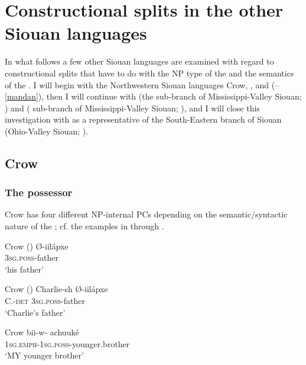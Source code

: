 \documentclass[output=paper]{LSP/langsci}
\begin{document}
\section{Constructional splits in the other Siouan languages}

In what follows a few other Siouan languages are examined with regard to constructional splits that have to do with the NP type of the  and the semantics of the . I will begin with the Northwestern Siouan languages Crow, , and  (--\ref{mandan}), then I will continue with  (the  sub-branch of Mississippi-Valley Siouan; ) and  ( sub-branch of Mississippi-Valley Siouan; ), and I will close this investigation with  as a representative of the South-Eastern branch of Siouan (Ohio-Valley Siouan; ).
 
\subsection{Crow}\label{sec:helmbrecht:4.1} \label{crow} 
\subsubsection{The possessor}
Crow has four different NP-internal PCs depending on the semantic/syntactic nature of the ; cf. the examples in  through . 

\ea {}Crow (\citealt[234]{Graczyk2007}) \label{crowfather}
\ex
\gll Ø-iilápxe \\
\textsc{3sg.poss}-father \\
\glt `his father'
\z
\z

\ea {}Crow (\citealt[234]{Graczyk2007}) \label{crowcharlie}
\ex
\gll Charlie-sh 		Ø-iilápxe \\
C.-\textsc{det}      \textsc{3sg.poss}-father \\
\glt `Charlie's father'
\z \z

\ea	{}Crow \citep[235]{Graczyk2007} \label{crowbrother}
\ex 
\gll bii-w- achuuké \\
\textsc{1sg.emph-1sg.poss}-younger.brother \\
\glt `MY younger brother'
\z \z
\end{document}
